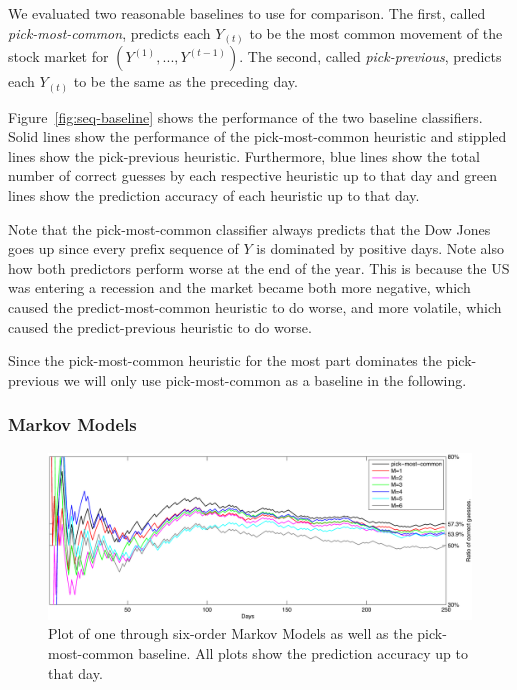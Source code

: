 \documentclass[10pt, twocolumn]{article}
\begin{document}
We evaluated two reasonable baselines to use for comparison.
The first, called \emph{pick-most-common}, predicts each $Y_{(t)}$ to be the most common movement of the stock market for $(Y^{(1)}, ..., Y^{(t-1)})$.
The second, called \emph{pick-previous}, predicts each $Y_{(t)}$ to be the same as the preceding day.

Figure~\ref{fig:seq-baseline} shows the performance of the two baseline classifiers.
Solid lines show the performance of the pick-most-common heuristic and stippled lines show the pick-previous heuristic.
Furthermore, blue lines show the total number of correct guesses by each respective heuristic up to that day and green lines show the prediction accuracy of each heuristic up to that day.

Note that the pick-most-common classifier always predicts that the Dow Jones goes up since every prefix sequence of $Y$ is dominated by positive days. 
Note also how both predictors perform worse at the end of the year.
This is because the US was entering a recession and the market became both more negative, which caused the predict-most-common heuristic to do worse, and more volatile, which caused the predict-previous heuristic to do worse.

Since the pick-most-common heuristic for the most part dominates the pick-previous we will only use pick-most-common as a baseline in the following.


\subsubsection{Markov Models}
\label{mm-eval}

\begin{figure}
\center
\hspace{0.5cm}
\includegraphics[width=16cm]{experiments/mm_experiment.pdf}
\caption{Plot of one through six-order Markov Models as well as the pick-most-common baseline. All plots show the prediction accuracy up to that day.}
\label{fig:mm-experiment}
\end{figure}
\end{document}
